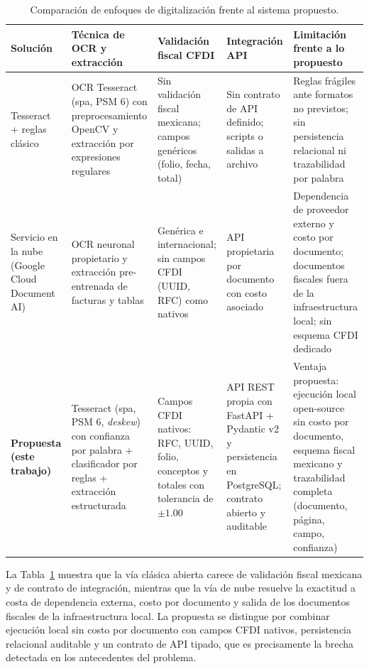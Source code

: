 \begin{table}[H]
  \centering
  \small
  \caption{Comparación de enfoques de digitalización frente al sistema propuesto.}
  \label{tab:comparativa_antecedentes}
  \begin{tabular}{@{}p{2.2cm}p{2.7cm}p{2.7cm}p{2.7cm}p{2.7cm}@{}}
    \toprule
    \textbf{Solución} & \textbf{Técnica de OCR y extracción} & \textbf{Validación fiscal CFDI} & \textbf{Integración API} & \textbf{Limitación frente a lo propuesto} \\
    \midrule
    Tesseract + reglas clásico &
    OCR Tesseract (spa, PSM 6) con preprocesamiento OpenCV y extracción por expresiones regulares &
    Sin validación fiscal mexicana; campos genéricos (folio, fecha, total) &
    Sin contrato de API definido; scripts o salidas a archivo &
    Reglas frágiles ante formatos no previstos; sin persistencia relacional ni trazabilidad por palabra \\
    \midrule
    Servicio en la nube (Google Cloud Document AI) &
    OCR neuronal propietario y extracción pre-entrenada de facturas y tablas &
    Genérica e internacional; sin campos CFDI (UUID, RFC) como nativos &
    API propietaria por documento con costo asociado &
    Dependencia de proveedor externo y costo por documento; documentos fiscales fuera de la infraestructura local; sin esquema CFDI dedicado \\
    \midrule
    \textbf{Propuesta (este trabajo)} &
    Tesseract (spa, PSM 6, \textit{deskew}) con confianza por palabra + clasificador por reglas + extracción estructurada &
    Campos CFDI nativos: RFC, UUID, folio, conceptos y totales con tolerancia de $\pm 1.00$ &
    API REST propia con FastAPI + Pydantic v2 y persistencia en PostgreSQL; contrato abierto y auditable &
    Ventaja propuesta: ejecución local open-source sin costo por documento, esquema fiscal mexicano y trazabilidad completa (documento, página, campo, confianza) \\
    \bottomrule
  \end{tabular}
\end{table}

La Tabla~\ref{tab:comparativa_antecedentes} muestra que la vía clásica abierta carece de validación fiscal mexicana y de contrato de integración, mientras que la vía de nube resuelve la exactitud a costa de dependencia externa, costo por documento y salida de los documentos fiscales de la infraestructura local. La propuesta se distingue por combinar ejecución local sin costo por documento con campos CFDI nativos, persistencia relacional auditable y un contrato de API tipado, que es precisamente la brecha detectada en los antecedentes del problema.
